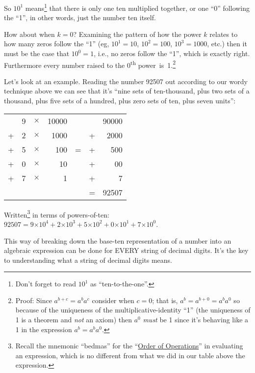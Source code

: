 \documentclass{article}
\begin{document}
So $10^1$ means\footnote{Don't forget to read $10^1$
as ``ten-to-the-one''.} that there is only one ten multiplied together,
or one ``0'' following the ``1'',
in other words, just the number ten itself.

How about when $k=0$?
Examining the pattern of how the power $k$ relates to how many zeros follow the ``1''
(eg, $10^1=10$, $10^2=100$, $10^3=1000$,
etc.) then it must be the case that $10^0=1$,
i.e., no zeros follow the ``1'', which is exactly right.
Furthermore every number raised to the 0\textsuperscript{th}
power~is~1.\footnote{Proof: Since $a^{b+c}=a^ba^c$ consider when $c=0$; that is,
$a^b=a^{b+0}=a^ba^0$ so because of the uniqueness
of the multiplicative-identity ``1'' (the uniqueness of 1
is a theorem and \emph{not} an axiom) then $a^0$ \emph{must} be 1 since it's behaving 
like a 1 in the expression $a^b=a^ba^0$.}

Let's look at an example.
Reading the number 92507 out according to our wordy technique above we can see
that it's ``nine sets of ten-thousand,
plus two sets of a thousand, plus five sets of a hundred,
plus zero sets of ten, plus seven units'':

\begin{center}
\begin{tabular}{r r r r c r r}
\phantom & 9 & $\times$ & 10000 & \phantom & \phantom & 90000\\
+ & 2 & $\times$ & 1000 & \phantom & + & 2000\\
+ & 5 & $\times$ & 100 & \; \; \; = \; \; \; & + & 500\\
+ & 0 & $\times$ & 10 & \phantom & + & 00\\
+ & 7 & $\times$ & 1 & \phantom & + & 7\\
\cline{6-7}
\phantom & \phantom & \phantom & \phantom & \phantom & = & 92507
\end{tabular}
\end{center}

Written\footnote{Recall the mnemonic ``bedmas'' for
the ``\href{https://en.wikipedia.org/wiki/Order_of_operations}{Order of Operations}'' in
evaluating an expression, which is no different from
what we did in our table above the expression.}
in terms of powers-of-ten:
$92507=9{\times{}}10^4+2{\times{}}10^3+5{\times{}}10^2+0{\times{}}10^1+7{\times{}}10^0$.

This way of breaking down the base-ten representation of a number into
an algebraic expression can be done for EVERY string of decimal digits. It's the key to 
understanding what a string of decimal digits means.
\end{document}
